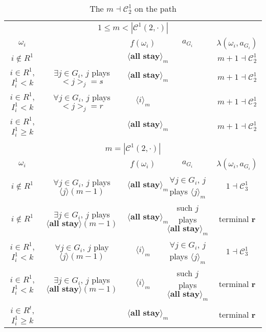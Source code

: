 \documentclass[12pt,letter]{article}
\newcommand{\Kappa}{\mathcal{C}}
\theoremstyle{definition}
\theoremstyle{remark}
\theoremstyle{claim}
\begin{document}
\begin{landscape}
\begin{table}[!htbp]
\caption{The $m\dashv\Kappa^1_{2}$ on the path}
\label{table:eqm_path_k02}
\begin{center}
\begin{tabular}{c c | c | c | c}
\multicolumn{5}{c}{$1\leq m < |\Kappa^1(2,\cdot)|$}\\
$\omega_i$ 	 & 	   &	$f(\omega_i)$  &	$a_{G_i}$ & $\lambda(\omega_i,a_{G_i})$ \\
\hline
\hline
$i\notin R^1$  	& & $\langle \textbf{all stay} \rangle_m$	&    & $m+1\dashv \Kappa^1_{2}$\\
$i\in R^1$, $I^1_i< k$  	& $\exists j\in G_i$, $j$ plays $<j>_j=s$	& $\langle \textbf{all stay} \rangle_m$	& 	& $m+1\dashv \Kappa^1_{2}$\\
$i\in R^1$, $I^1_i< k$  	& $\forall j\in G_i$, $j$ plays $<j>_j=r$ 	& $\langle i \rangle_m$	& 	& $m+1\dashv \Kappa^1_{2}$\\
$i\in R^1$, $I^1_i\geq k$  	& 	& $\langle \textbf{all stay} \rangle_m$	&	& $m+1\dashv \Kappa^1_{2}$\\
\hline
\\
\multicolumn{5}{c}{$m= |\Kappa^1(2,\cdot)|$}\\
$\omega_i$ 	 & 	   &	$f(\omega_i)$  &	$a_{G_i}$ & $\lambda(\omega_i,a_{G_i})$ \\
\hline
\hline
$i\notin R^1$  	& $\forall j\in G_i$, $j$ plays $\langle j \rangle(m-1)$    & $\langle \textbf{all stay} \rangle_m$	& $\forall j\in G_i$, $j$ plays $\langle j \rangle_m$	& $1\dashv \Kappa^1_{3}$\\
$i\notin R^1$  	& $\exists j\in G_i$, $j$ plays $\langle \textbf{all stay} \rangle(m-1)$   & $\langle \textbf{all stay} \rangle_m$	& such $j$ plays $\langle \textbf{all stay} \rangle_m$	& terminal \textbf{r}\\
$i\in R^1$, $I^1_i< k$   	& $\forall j\in G_i$, $j$ play $\langle j \rangle(m-1)$ 	& $\langle i \rangle_m$	&  $\forall j\in G_i$, $j$ plays $\langle j \rangle_m$	& $1\dashv \Kappa^1_{3}$ \\
$i\in R^1$, $I^1_i< k$   	&  $\exists j\in G_i$, $j$ plays $\langle \textbf{all stay} \rangle(m-1)$ 	& $\langle i \rangle_m$	& such $j$ plays $\langle \textbf{all stay} \rangle_m$	&  terminal \textbf{r}\\
$i\in R^t$, $I^1_i\geq k$  	& 	& $\langle \textbf{all stay} \rangle_m$	& 	& terminal \textbf{r} \\
\hline
\end{tabular}
\end{center}
\end{table}

\end{landscape}
\end{document}

